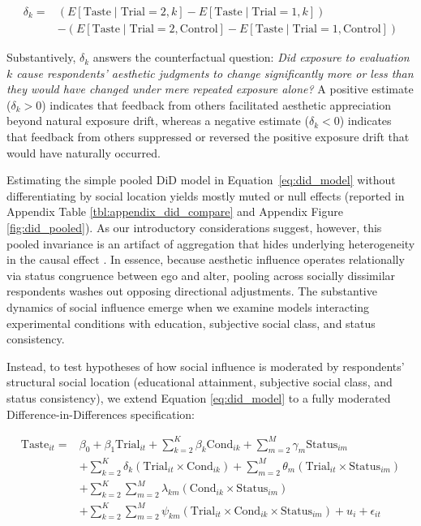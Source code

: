 \documentclass[12pt, letterpaper]{article}
\begin{document}
\begin{equation}
\begin{split}
\delta_k = {} & \left( E[\text{Taste} \mid \text{Trial} = 2, k] - E[\text{Taste} \mid \text{Trial} = 1, k] \right) \\
              & - \left( E[\text{Taste} \mid \text{Trial} = 2, \text{Control}] - E[\text{Taste} \mid \text{Trial} = 1, \text{Control}] \right)
\end{split}
\end{equation}

Substantively, $\delta_k$ answers the counterfactual question: \textit{Did exposure to evaluation $k$ cause respondents' aesthetic judgments to change significantly more or less than they would have changed under mere repeated exposure alone?} A positive estimate ($\delta_k > 0$) indicates that feedback from others facilitated aesthetic appreciation beyond natural exposure drift, whereas a negative estimate ($\delta_k < 0$) indicates that feedback from others suppressed or reversed the positive exposure drift that would have naturally occurred.

Estimating the simple pooled DiD model in Equation~\ref{eq:did_model} without differentiating by social location yields mostly muted or null effects (reported in Appendix Table \ref{tbl:appendix_did_compare} and Appendix Figure \ref{fig:did_pooled}). As our introductory considerations suggest, however, this pooled invariance is an artifact of aggregation that hides underlying heterogeneity in the causal effect \citep{brand2013causal}. In essence, because aesthetic influence operates relationally via status congruence between ego and alter, pooling across socially dissimilar respondents washes out opposing directional adjustments. The substantive dynamics of social influence emerge when we examine models interacting experimental conditions with education, subjective social class, and status consistency.

Instead, to test hypotheses of how social influence is moderated by respondents' structural social location (educational attainment, subjective social class, and status consistency), we extend Equation \ref{eq:did_model} to a fully moderated Difference-in-Differences specification:

\begin{equation}
\begin{split}
\text{Taste}_{it} = {} & \beta_0 + \beta_{1} \text{Trial}_{it} + \sum_{k=2}^{K} \beta_{k} \text{Cond}_{ik} + \sum_{m=2}^{M} \gamma_m \text{Status}_{im} \\
& + \sum_{k=2}^{K} \delta_k (\text{Trial}_{it} \times \text{Cond}_{ik}) + \sum_{m=2}^{M} \theta_m (\text{Trial}_{it} \times \text{Status}_{im}) \\
& + \sum_{k=2}^{K} \sum_{m=2}^{M} \lambda_{km} (\text{Cond}_{ik} \times \text{Status}_{im}) \\
& + \sum_{k=2}^{K} \sum_{m=2}^{M} \psi_{km} (\text{Trial}_{it} \times \text{Cond}_{ik} \times \text{Status}_{im}) + u_i + \epsilon_{it}
\end{split}
\label{eq:did_moderation_model}
\end{equation}
\end{document}
